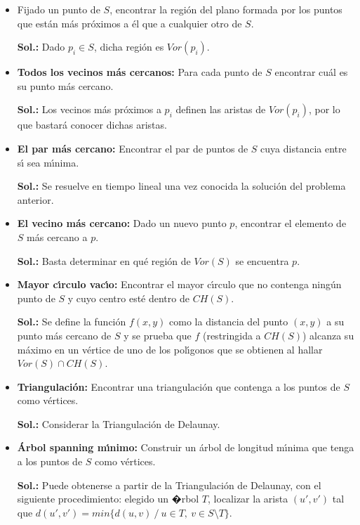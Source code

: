 \documentclass[ebook,oneside]{memoir}
\begin{document}
\begin{itemize}

  \item Fijado un punto de $S$, encontrar la regi\'{o}n del plano formada por los puntos que est\'{a}n m\'{a}s pr\'{o}ximos a \'{e}l que a cualquier otro de $S$.

  \item[\textbf{Sol.:}] Dado $p_i \in S$, dicha regi\'{o}n es $Vor(p_i)$.


  \item \textbf{Todos los vecinos m\'{a}s cercanos:} Para cada punto de $S$ encontrar cu\'{a}l es su punto m\'{a}s cercano.

  \item[\textbf{Sol.:}] Los vecinos m\'{a}s pr\'{o}ximos a $p_i$ definen las aristas de $Vor(p_i)$, por lo que bastar\'{a} conocer dichas aristas.


  \item \textbf{El par m\'{a}s cercano:} Encontrar el par de puntos de $S$ cuya distancia entre s\'{\i} sea m\'{\i}nima.

  \item[\textbf{Sol.:}] Se resuelve en tiempo lineal una vez conocida la soluci\'{o}n del
problema anterior.


  \item \textbf{El vecino m\'{a}s cercano:} Dado un nuevo punto $p$,
encontrar el elemento de $S$ m\'{a}s cercano a $p$.

  \item[\textbf{Sol.:}] Basta determinar en qu\'{e} regi\'{o}n de $Vor(S)$ se encuentra $p$.


  \item \textbf{Mayor c\'{\i}rculo vac\'{\i}o:} Encontrar el mayor c\'{\i}rculo que no contenga ning\'{u}n punto de $S$ y cuyo centro est\'{e} dentro de $CH(S)$.

  \item[\textbf{Sol.:}] Se define la funci\'{o}n $f(x,y)$ como la distancia del punto $(x,y)$ a su punto m\'{a}s cercano de $S$ y se prueba que $f$ (restringida a $CH(S)$) alcanza su m\'{a}ximo en un v\'{e}rtice de uno de los pol\'{\i}gonos que se obtienen al hallar $Vor(S)\cap CH(S)$.


  \item \textbf{Triangulaci\'{o}n:} Encontrar una triangulaci\'{o}n que contenga a los puntos de $S$ como v\'{e}rtices.

  \item[\textbf{Sol.:}] Considerar la Triangulaci\'on de Delaunay.


  \item \textbf{\'{A}rbol spanning m\'{\i}nimo:} Construir un \'{a}rbol de longitud m\'{\i}nima que tenga a los puntos de $S$ como v\'{e}rtices.

  \item[\textbf{Sol.:}] Puede obtenerse a partir de la Triangulaci\'on de Delaunay, con el siguiente procedimiento: elegido un �rbol $T$, localizar la arista $(u',v')$ tal que $d(u',v')={ min}\{d(u,v) \ / \ u\in T, \ v\in S\setminus T\}$.

\end{itemize}
\end{document}

